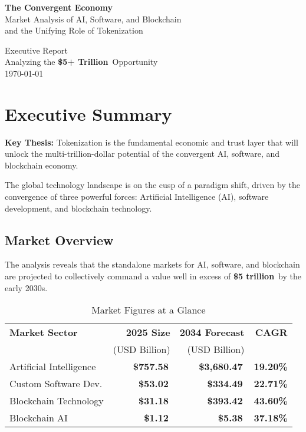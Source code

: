 \documentclass[11pt,a4paper]{report}
\newcommand{\marketvalue}[2]{\textcolor{accentgreen}{\textbf{\$#1}}\,\textcolor{darkgray}{#2}}
\newcommand{\cagr}[1]{\textcolor{primaryblue}{\textbf{#1\%}}}
\begin{document}
\begin{titlepage}
    \centering
    \vspace*{2cm}
    {\Huge\bfseries The Convergent Economy}\\[1cm]
    {\Large Market Analysis of AI, Software, and Blockchain\\and the Unifying Role of Tokenization}\\[2cm]
    
    \vfill
    
    {\large Executive Report\\Analyzing the \marketvalue{5+ Trillion}{} Opportunity\\[0.5cm]\today}
\end{titlepage}

\tableofcontents

\chapter*{Executive Summary}

\textbf{Key Thesis:} Tokenization is the fundamental economic and trust layer that will unlock the multi-trillion-dollar potential of the convergent AI, software, and blockchain economy.

The global technology landscape is on the cusp of a paradigm shift, driven by the convergence of three powerful forces: Artificial Intelligence (AI), software development, and blockchain technology.

\section*{Market Overview}

The analysis reveals that the standalone markets for AI, software, and blockchain are projected to collectively command a value well in excess of \marketvalue{5 trillion}{} by the early 2030s.

\begin{table}[h]
\centering
\caption{Market Figures at a Glance}
\begin{tabular}{lrrr}
\toprule
\textbf{Market Sector} & \textbf{2025 Size} & \textbf{2034 Forecast} & \textbf{CAGR} \\
& (USD Billion) & (USD Billion) & \\
\midrule
Artificial Intelligence & \marketvalue{757.58}{} & \marketvalue{3,680.47}{} & \cagr{19.20} \\
Custom Software Dev. & \marketvalue{53.02}{} & \marketvalue{334.49}{} & \cagr{22.71} \\
Blockchain Technology & \marketvalue{31.18}{} & \marketvalue{393.42}{} & \cagr{43.60} \\
Blockchain AI & \marketvalue{1.12}{} & \marketvalue{5.38}{} & \cagr{37.18} \\
\bottomrule
\end{tabular}
\end{table}
\end{document}

